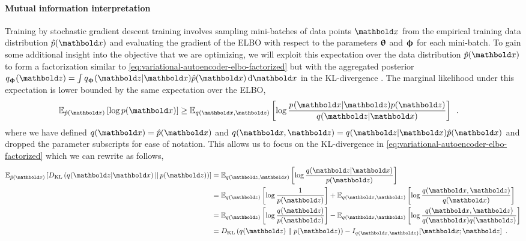 \paragraph{Mutual information interpretation}
Training by stochastic gradient descent training involves sampling mini-batches of data points $\xb$ from the empirical training data distribution $\hat{p}(\xb)$ and evaluating the gradient of the ELBO with respect to the parameters ${\boldsymbol{\uptheta}}$ and ${\boldsymbol{\upphi}}$ for each mini-batch. 
To gain some additional insight into the objective that we are optimizing, we will exploit this expectation over the data distribution $\hat{p}(\xb)$ to form a factorization similar to \cref{eq:variational-autoencoder-elbo-factorized} but with the aggregated posterior $q_\phib(\zb) = \int q_\phib(\zb|\xb)\hat{p}(\xb)\,\mathrm{d}\xb$ in the KL-divergence \parencite{tomczak_trouble_2022}. 
The marginal likelihood under this expectation is lower bounded by the same expectation over the ELBO,
%
\begin{align} \label{eq:variational-autoencoder-elbo-expected}
    \mathbb{E}_{\hat{p}(\xb)}\left[ \log p(\xb) \right] 
    &\geq \mathbb{E}_{q_{}(\xb,\zb)}\left[ \log \frac{p_{}(\xb|\zb)p(\zb)}{q_{}(\zb|\xb)} \right] \enspace .
\end{align}
%
where we have defined $q(\xb) = \hat{p}(\xb)$ and $q_{}(\xb,\zb) = q_{}(\zb|\xb)\hat{p}(\xb)$ and dropped the parameter subscripts for ease of notation. 
This allows us to focus on the KL-divergence in \cref{eq:variational-autoencoder-elbo-factorized} which we can rewrite as follows,
%
\begin{align} \label{eq:variational-autoencoder-kl-factor-expected}
    \mathbb{E}_{\hat{p}(\xb)} \left[ D_\text{KL}\left( q_{}(\zb|\xb) \,||\, p(\zb) \right) \right]
    &= \mathbb{E}_{q_{}(\zb,\xb)} \left[ \log \frac{q_{}(\zb|\xb)}{p(\zb)}\right] \nonumber \\
    &= \mathbb{E}_{q_{}(\zb)}\left[ \log \frac{1}{p(\zb)} \right] + \mathbb{E}_{q_{}(\xb,\zb)}\left[ \log \frac{q_{}(\xb,\zb)}{q(\xb)} \right] \nonumber \\
    &= \mathbb{E}_{q_{}(\zb)}\left[ \log \frac{q_{}(\zb)}{p(\zb)} \right] - \mathbb{E}_{q_{}(\xb,\zb)}\left[ \log \frac{q_{}(\xb,\zb)}{q(\xb)q_{}(\zb)} \right] \nonumber \\
    &= D_\mathrm{KL}\left( q_{}(\zb) \parallel p(\zb) \right) - I_{q_{}(\xb,\zb)}[\xb;\zb] \enspace .
\end{align}
